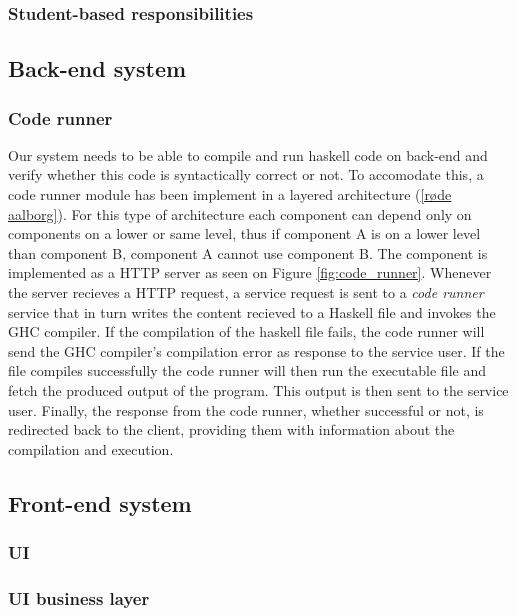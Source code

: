 \subsubsection*{Student-based responsibilities}



\subsection{Back-end system}


\subsubsection{Code runner}
Our system needs to be able to compile and run haskell code on back-end and verify whether this code is syntactically correct or not.
To accomodate this, a code runner module has been implement in a layered architecture (\ref{røde aalborg}).
For this type of architecture each component can depend only on components on a lower or same level, thus if component A is on a lower level than component B, component A cannot use component B.
The component is implemented as a HTTP server as seen on Figure \ref{fig:code_runner}.
Whenever the server recieves a HTTP request, a service request is sent to a \textit{code runner} service that in turn writes the content recieved to a Haskell file and invokes the GHC compiler.
If the compilation of the haskell file fails, the code runner will send the GHC compiler's compilation error as response to the service user.
If the file compiles successfully the code runner will then run the executable file and fetch the produced output of the program.
This output is then sent to the service user.
Finally, the response from the code runner, whether successful or not, is redirected back to the client, providing them with information about the compilation and execution.



\subsection{Front-end system}

\subsubsection{UI}

\subsubsection{UI business layer}